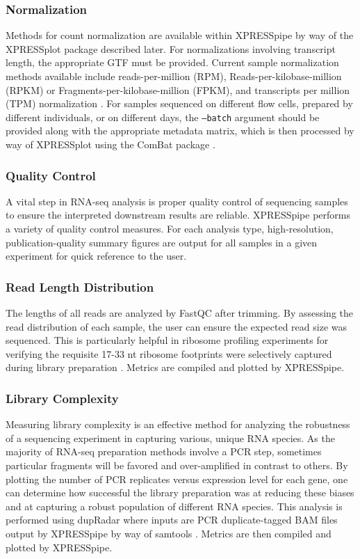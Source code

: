 \documentclass[11pt, a4paper, oneside]{article}
\begin{document}
\subsubsection{Normalization}
Methods for count normalization are available within XPRESSpipe by way of the XPRESSplot package described later. For normalizations involving transcript length, the appropriate GTF must be provided. Current sample normalization methods available include reads-per-million (RPM), Reads-per-kilobase-million (RPKM) or Fragments-per-kilobase-million (FPKM), and transcripts per million (TPM) normalization \cite{evans_briefbio}. For samples sequenced on different flow cells, prepared by different individuals, or on different days, the \texttt{--batch} argument should be provided along with the appropriate metadata matrix, which is then processed by way of XPRESSplot using the ComBat package \cite{sva}.

\subsubsection{Quality Control}
  A vital step in RNA-seq analysis is proper quality control of sequencing samples to ensure the interpreted downstream results are reliable. XPRESSpipe performs a variety of quality control measures. For each analysis type, high-resolution, publication-quality summary figures are output for all samples in a given experiment for quick reference to the user.

\subsubsection{Read Length Distribution}
The lengths of all reads are analyzed by FastQC \cite{fastqc} after trimming. By assessing the read distribution of each sample, the user can ensure the expected read size was sequenced. This is particularly helpful in ribosome profiling experiments for verifying the requisite 17-33 nt ribosome footprints were selectively captured during library preparation \cite{ingolia_meth, fp_range}. Metrics are compiled and plotted by XPRESSpipe.

\subsubsection{Library Complexity}
Measuring library complexity is an effective method for analyzing the robustness of a sequencing experiment in capturing various, unique RNA species. As the majority of RNA-seq preparation methods involve a PCR step, sometimes particular fragments will be favored and over-amplified in contrast to others. By plotting the number of PCR replicates versus expression level for each gene, one can determine how successful the library preparation was at reducing these biases and at capturing a robust population of different RNA species. This analysis is performed using dupRadar \cite{dupradar} where inputs are PCR duplicate-tagged BAM files output by XPRESSpipe by way of samtools \cite{samtools}. Metrics are then compiled and plotted by XPRESSpipe.
\end{document}
